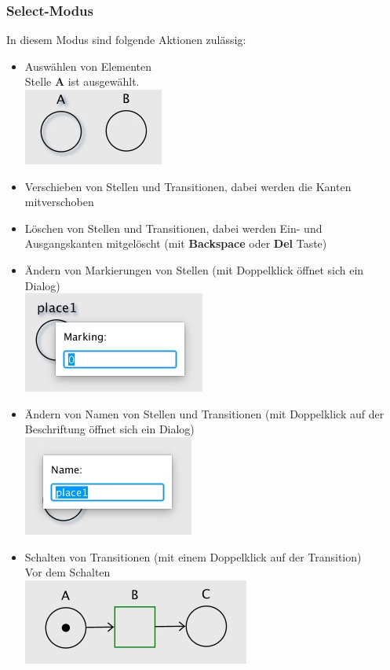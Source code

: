 \documentclass[12pt]{article}
\begin{document}
\subsubsection{Select-Modus}

In diesem Modus sind folgende Aktionen zulässig:
\begin{itemize}
\item{Auswählen von Elementen} \\
Stelle \textbf{A} ist ausgewählt. \\
\includegraphics[scale=0.5]{select}
\item{Verschieben von Stellen und Transitionen, dabei werden die Kanten mitverschoben}
\item{Löschen von Stellen und Transitionen, dabei werden Ein- und Ausgangskanten mitgelöscht (mit \textbf{Backspace} oder \textbf{Del} Taste)}
\item{Ändern von Markierungen von Stellen (mit Doppelklick öffnet sich ein Dialog)} \\
\includegraphics[scale=0.5]{marking}
\item{Ändern von Namen von Stellen und Transitionen (mit Doppelklick auf der Beschriftung öffnet sich ein Dialog) } \\
\includegraphics[scale=0.55]{name}
\item{Schalten von Transitionen (mit einem Doppelklick auf der Transition)} \\
Vor dem Schalten \\
\includegraphics[scale=0.5]{trans_before} \\

\end{itemize}
\end{document}
